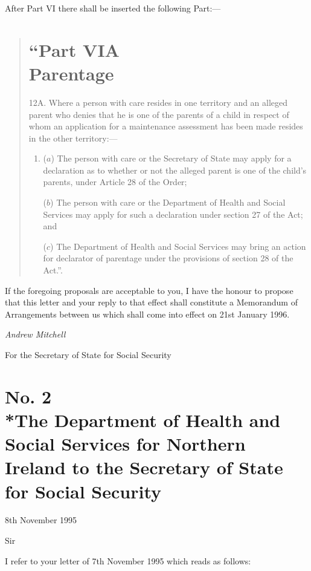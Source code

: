 \documentclass[12pt,a4paper]{article}
\begin{document}
  After Part VI there shall be inserted the following Part:—
\begin{quotation}
 \section*{“Part VIA\\Parentage}

12A.  Where a person with care resides in one territory and an alleged parent who denies that he is one of the parents of a child in respect of whom an application for a maintenance assessment has been made resides in the other territory:—
\begin{enumerate}\item[]
($a$) The person with care or the Secretary of State may apply for a declaration as to whether or not the alleged parent is one of the child’s parents, under Article 28 of the Order;

($b$) The person with care or the Department of Health and Social Services may apply for such a declaration under section 27 of the Act; and

($c$) The Department of Health and Social Services may bring an action for declarator of parentage under the provisions of section 28 of the Act.”.
\end{enumerate}
\end{quotation}

  If the foregoing proposals are acceptable to you, I have the honour to propose that this letter and your reply to that effect shall constitute a Memorandum of Arrangements between us which shall come into effect on 21st January 1996.

  \emph{Andrew Mitchell}

  For the Secretary of State for Social Security

\section*{\sloppy No. 2\\*The Department of Health and Social Services for Northern Ireland to the Secretary of State for Social Security}

8th November 1995

  Sir

  I refer to your letter of 7th November 1995 which reads as follows:
\end{document}
